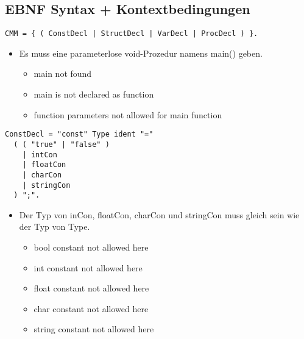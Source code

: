 
\subsection{EBNF Syntax + Kontextbedingungen}


\begin{samepage}
\begin{lstlisting}[language=EBNF]
CMM	= { ( ConstDecl | StructDecl | VarDecl | ProcDecl ) }.
\end{lstlisting}
\begin{itemize}
  \item Es muss eine parameterlose void-Prozedur namens main() geben.
  \begin{itemize}
    \item main not found
    \item main is not declared as function
    \item function parameters not allowed for main function
  \end{itemize}
\end{itemize}
\end{samepage}


\begin{samepage}
\begin{lstlisting}[language=EBNF]
ConstDecl = "const" Type ident "=" 
  ( ( "true" | "false" ) 
    | intCon
    | floatCon
    | charCon
    | stringCon
  ) ";".
\end{lstlisting}
\begin{itemize}
  \item Der Typ von inCon, floatCon, charCon und stringCon muss gleich sein wie der Typ von Type.
  \begin{itemize}
    \item bool constant not allowed here
    \item int constant not allowed here
    \item float constant not allowed here
    \item char constant not allowed here
    \item string constant not allowed here
  \end{itemize}
\end{itemize}
\end{samepage}

